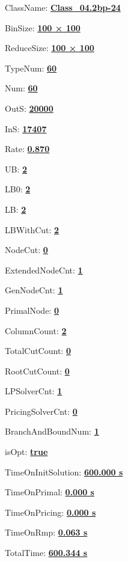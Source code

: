 \documentclass[11pt]{article}
\begin{document}
\pagestyle{empty}


ClassName: \underline{\textbf{Class_04.2bp-24}}
\par
BinSize: \underline{\textbf{100 × 100}}
\par
ReduceSize: \underline{\textbf{100 × 100}}
\par
TypeNum: \underline{\textbf{60}}
\par
Num: \underline{\textbf{60}}
\par
OutS: \underline{\textbf{20000}}
\par
InS: \underline{\textbf{17407}}
\par
Rate: \underline{\textbf{0.870}}
\par
UB: \underline{\textbf{2}}
\par
LB0: \underline{\textbf{2}}
\par
LB: \underline{\textbf{2}}
\par
LBWithCut: \underline{\textbf{2}}
\par
NodeCut: \underline{\textbf{0}}
\par
ExtendedNodeCnt: \underline{\textbf{1}}
\par
GenNodeCnt: \underline{\textbf{1}}
\par
PrimalNode: \underline{\textbf{0}}
\par
ColumnCount: \underline{\textbf{2}}
\par
TotalCutCount: \underline{\textbf{0}}
\par
RootCutCount: \underline{\textbf{0}}
\par
LPSolverCnt: \underline{\textbf{1}}
\par
PricingSolverCnt: \underline{\textbf{0}}
\par
BranchAndBoundNum: \underline{\textbf{1}}
\par
isOpt: \underline{\textbf{true}}
\par
TimeOnInitSolution: \underline{\textbf{600.000 s}}
\par
TimeOnPrimal: \underline{\textbf{0.000 s}}
\par
TimeOnPricing: \underline{\textbf{0.000 s}}
\par
TimeOnRmp: \underline{\textbf{0.063 s}}
\par
TotalTime: \underline{\textbf{600.344 s}}
\par
\newpage
\end{document}
